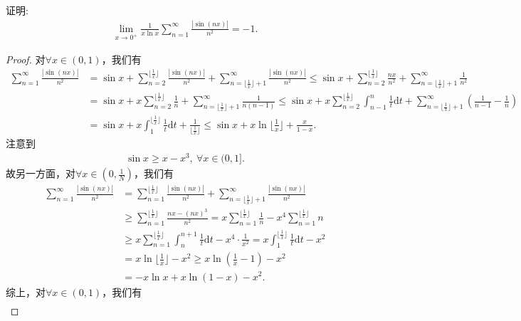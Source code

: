 \documentclass[../../main.tex]{subfiles}
\begin{document}
\begin{example}
证明:
\begin{align*}
\lim_{x \to 0^+} \frac{1}{x \ln x} \sum_{n=1}^{\infty} \frac{|\sin(nx)|}{n^2} = -1.
\end{align*}
\end{example}
\begin{proof}
对$\forall x\in (0,1)$，我们有
\begin{align*}
\sum_{n=1}^{\infty}\frac{|\sin(nx)|}{n^2} &= \sin x + \sum_{n=2}^{\lfloor \frac{1}{x} \rfloor}\frac{|\sin(nx)|}{n^2} + \sum_{n=\lfloor \frac{1}{x} \rfloor +1}^{\infty}\frac{|\sin(nx)|}{n^2} \leqslant \sin x + \sum_{n=2}^{\lfloor \frac{1}{x} \rfloor}\frac{nx}{n^2} + \sum_{n=\lfloor \frac{1}{x} \rfloor +1}^{\infty}\frac{1}{n^2} \\
&= \sin x + x\sum_{n=2}^{\lfloor \frac{1}{x} \rfloor}\frac{1}{n} + \sum_{n=\lfloor \frac{1}{x} \rfloor +1}^{\infty}\frac{1}{n(n-1)} \leqslant \sin x + x\sum_{n=2}^{\lfloor \frac{1}{x} \rfloor}\int_{n-1}^n\frac{1}{t}\mathrm{d}t + \sum_{n=\lfloor \frac{1}{x} \rfloor +1}^{\infty}\left( \frac{1}{n-1} - \frac{1}{n} \right) \\
&= \sin x + x\int_1^{\lfloor \frac{1}{x} \rfloor}\frac{1}{t}\mathrm{d}t + \frac{1}{\lfloor \frac{1}{x} \rfloor} \leqslant \sin x + x\ln \lfloor \frac{1}{x} \rfloor + \frac{x}{1-x}.
\end{align*}
注意到
\begin{align*}
\sin x\geqslant x-x^3,\ \forall x\in (0,1].
\end{align*}
故另一方面，对$\forall x\in (0,\frac{1}{N})$，我们有
\begin{align*}
\sum_{n=1}^{\infty}\frac{|\sin(nx)|}{n^2}&=\sum_{n=1}^{\lfloor \frac{1}{x} \rfloor}\frac{|\sin(nx)|}{n^2}+\sum_{n=\lfloor \frac{1}{x} \rfloor +1}^{\infty}\frac{|\sin(nx)|}{n^2} \\
&\geqslant \sum_{n=1}^{\lfloor \frac{1}{x} \rfloor}\frac{nx-(nx)^3}{n^2}=x\sum_{n=1}^{\lfloor \frac{1}{x} \rfloor}\frac{1}{n}-x^4\sum_{n=1}^{\lfloor \frac{1}{x} \rfloor}n \\
&\geqslant x\sum_{n=1}^{\lfloor \frac{1}{x} \rfloor}\int_n^{n+1}\frac{1}{t}\mathrm{d}t-x^4\cdot \frac{1}{x^2}=x\int_1^{\lfloor \frac{1}{x} \rfloor}\frac{1}{t}\mathrm{d}t-x^2 \\
&=x\ln \lfloor \frac{1}{x} \rfloor -x^2\geqslant x\ln \left( \frac{1}{x}-1 \right) -x^2\\
&=-x\ln x+x\ln \left( 1-x \right) -x^2.
\end{align*}
综上，对$\forall x\in (0,1)$，我们有
\begin{align*}

\end{align*}
\end{proof}
\end{document}
